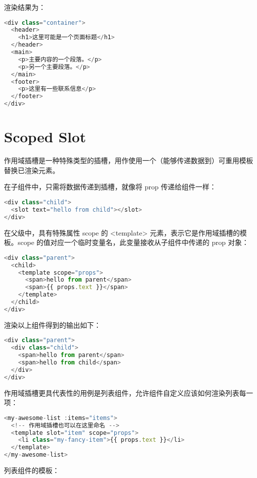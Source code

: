 渲染结果为：


\begin{lstlisting}[language=JavaScript]
<div class="container">
  <header>
    <h1>这里可能是一个页面标题</h1>
  </header>
  <main>
    <p>主要内容的一个段落。</p>
    <p>另一个主要段落。</p>
  </main>
  <footer>
    <p>这里有一些联系信息</p>
  </footer>
</div>
\end{lstlisting}


\section{Scoped Slot}

作用域插槽是一种特殊类型的插槽，用作使用一个（能够传递数据到）可重用模板替换已渲染元素。

在子组件中，只需将数据传递到插槽，就像将 prop 传递给组件一样：

\begin{lstlisting}[language=JavaScript]
<div class="child">
  <slot text="hello from child"></slot>
</div>
\end{lstlisting}

在父级中，具有特殊属性 scope 的 <template> 元素，表示它是作用域插槽的模板。scope 的值对应一个临时变量名，此变量接收从子组件中传递的 prop 对象：



\begin{lstlisting}[language=JavaScript]
<div class="parent">
  <child>
    <template scope="props">
      <span>hello from parent</span>
      <span>{{ props.text }}</span>
    </template>
  </child>
</div>
\end{lstlisting}


渲染以上组件得到的输出如下：

\begin{lstlisting}[language=JavaScript]
<div class="parent">
  <div class="child">
    <span>hello from parent</span>
    <span>hello from child</span>
  </div>
</div>
\end{lstlisting}


作用域插槽更具代表性的用例是列表组件，允许组件自定义应该如何渲染列表每一项：

\begin{lstlisting}[language=JavaScript]
<my-awesome-list :items="items">
  <!-- 作用域插槽也可以在这里命名 -->
  <template slot="item" scope="props">
    <li class="my-fancy-item">{{ props.text }}</li>
  </template>
</my-awesome-list>
\end{lstlisting}

列表组件的模板：


